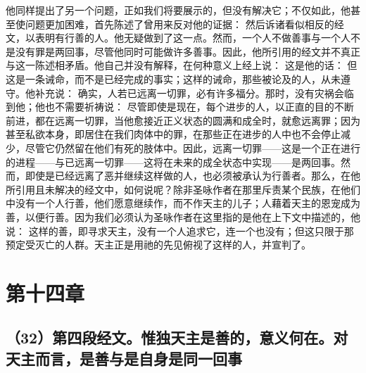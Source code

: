 他同样提出了另一个问题，正如我们将要展示的，但没有解决它；不仅如此，他甚至使问题更加困难，首先陈述了曾用来反对他的证据： 然后诉诸看似相反的经文，以表明有行善的人。他无疑做到了这一点。然而，一个人不做善事与一个人不是没有罪是两回事，尽管他同时可能做许多善事。因此，他所引用的经文并不真正与这一陈述相矛盾。他自己并没有解释，在何种意义上经上说： 这是他的话： 但这是一条诫命，而不是已经完成的事实；这样的诫命，那些被论及的人，从未遵守。他补充说：  确实，人若已远离一切罪，必有许多福分。那时，没有灾祸会临到他；他也不需要祈祷说：  尽管即使是现在，每个进步的人，以正直的目的不断前进，都在远离一切罪，当他愈接近正义状态的圆满和成全时，就愈远离罪；因为甚至私欲本身，即居住在我们肉体中的罪，在那些正在进步的人中也不会停止减少，尽管它仍然留在他们有死的肢体中。因此，远离一切罪——这是一个正在进行的进程——与已远离一切罪——这将在未来的成全状态中实现——是两回事。然而，即使是已经远离了恶并继续这样做的人，也必须被承认为行善者。那么，在他所引用且未解决的经文中，如何说呢？除非圣咏作者在那里斥责某个民族，在他们中没有一个人行善，他们愿意继续作，而不作天主的儿子；人藉着天主的恩宠成为善，以便行善。因为我们必须认为圣咏作者在这里指的是他在上下文中描述的，他说： 这样的善，即寻求天主，没有一个人追求它，连一个也没有；但这只限于那预定受灭亡的人群。天主正是用祂的先见俯视了这样的人，并宣判了。\par


\section{第十四章}


\subsection{（32）第四段经文。惟独天主是善的，意义何在。对天主而言，是善与是自身是同一回事}


